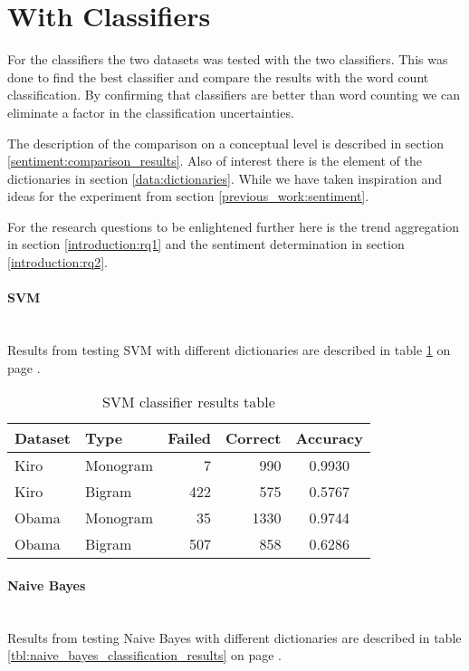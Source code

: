\section{With Classifiers}\label{experiments:calssifiers}
For the classifiers the two datasets was tested with the two classifiers.
This was done to find the best classifier and compare the results
with the word count classification. By confirming that classifiers are better
than word counting we can eliminate a factor in the classification
uncertainties. 

The description of the comparison on a conceptual level is described in section
\ref{sentiment:comparison_results}. Also of interest there is the element of
the dictionaries in section \ref{data:dictionaries}. While we have taken
inspiration and ideas for the experiment from section
\ref{previous_work:sentiment}.

For the research questions to be enlightened further here is the trend
aggregation in section \ref{introduction:rq1} and the sentiment determination
in section \ref{introduction:rq2}.

\paragraph{SVM}\label{experiments:svm_classification}
\hspace{0pt}\\
Results from testing SVM with different dictionaries are described in table
\ref{tbl:svm_classifier_results} on page
\pageref{tbl:svm_classifier_results}.

\begin{table}
\centering
\label{tbl:svm_classifier_results}
\caption{SVM classifier results table}
\begin{tabular}{ l l r r c }
Dataset & Type & Failed & Correct & Accuracy \\
\hline
Kiro & Monogram & 7 & 990 & 0.9930 \\
Kiro & Bigram & 422 & 575 & 0.5767 \\
Obama & Monogram & 35 & 1330 & 0.9744 \\
Obama & Bigram & 507 & 858 & 0.6286 \\
\end{tabular}
\end{table}

\paragraph{Naive Bayes}\label{experiments:naive_bayes_classification}
\hspace{0pt}\\
Results from testing Naive Bayes with different dictionaries are described in
table \ref{tbl:naive_bayes_classification_results} on page
\pageref{tbl:naive_bayes_classification_results}.

